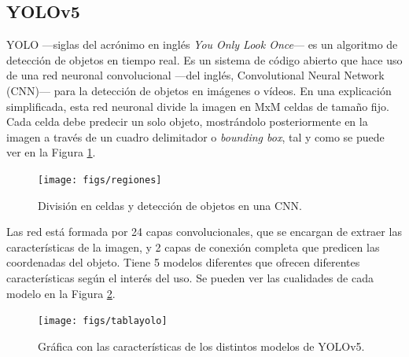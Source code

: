 \subsection{YOLOv5}
\label{sec:yolo}
YOLO ---siglas del acrónimo en inglés \textit{You Only Look Once}--- es un algoritmo de detección de objetos en tiempo real. Es un sistema de código abierto que hace uso de una red neuronal convolucional ---del inglés, Convolutional Neural Network (CNN)--- para la detección de objetos en imágenes o vídeos. En una explicación simplificada, esta red neuronal divide la imagen en MxM celdas de tamaño fijo. Cada celda debe predecir un solo objeto, mostrándolo posteriormente en la imagen a través de un cuadro delimitador o \textit{bounding box}, tal y como se puede ver en la Figura \ref{fig:regiones}.\\
\begin{figure} [h!]
  \begin{center}
    \texttt{[image: figs/regiones]}
  \end{center}
  \caption{División en celdas y detección de objetos en una CNN.}
  \label{fig:regiones}
\end{figure}
Las red está formada por 24 capas convolucionales, que se encargan de extraer las características de la imagen, y 2 capas de conexión completa que predicen las coordenadas del objeto. Tiene 5 modelos diferentes que ofrecen diferentes características según el interés del uso. Se pueden ver las cualidades de cada modelo en la Figura \ref{fig:tablayolo}. \\
\begin{figure} [h!]
  \begin{center}
    \texttt{[image: figs/tablayolo]}
  \end{center}
  \caption[]{Gráfica con las características de los distintos modelos de YOLOv5. \footnotemark} \label{fig:tablayolo}
\end{figure}
